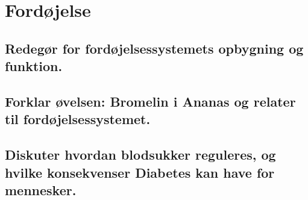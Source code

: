 \newpage
\section{Fordøjelse}
\subsection{Redegør for fordøjelsessystemets opbygning og funktion.}
\subsection{Forklar øvelsen: Bromelin i Ananas og relater til fordøjelsessystemet.}
\subsection{Diskuter hvordan blodsukker reguleres, og hvilke konsekvenser Diabetes kan have for mennesker.}